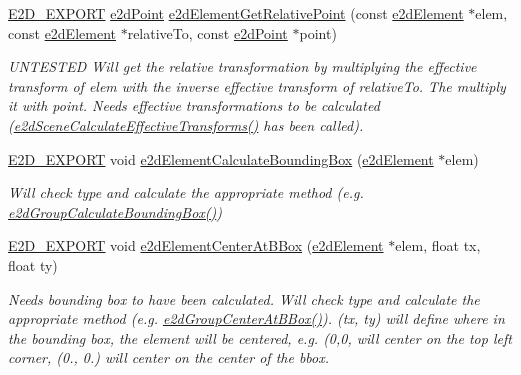 \begin{DoxyCompactItemize}
\hyperlink{Ez2DS_8h_a9f14e9cb869e1a85fdaba03afcca0df9}{E2\-D\-\_\-\-E\-X\-P\-O\-R\-T} \hyperlink{structe2dPoint}{e2d\-Point} \hyperlink{group__e2dElement_gae6b6f57ac5505ef9181289197d419536}{e2d\-Element\-Get\-Relative\-Point} (const \hyperlink{structe2dElement}{e2d\-Element} $\ast$elem, const \hyperlink{structe2dElement}{e2d\-Element} $\ast$relative\-To, const \hyperlink{structe2dPoint}{e2d\-Point} $\ast$point)
\begin{DoxyCompactList}\small\item\em U\-N\-T\-E\-S\-T\-E\-D Will get the relative transformation by multiplying the effective transform of elem with the inverse effective transform of relative\-To. The multiply it with point. Needs effective transformations to be calculated (\hyperlink{group__e2dScene_ga6981f2448904c96723449cb84ffb4d8a}{e2d\-Scene\-Calculate\-Effective\-Transforms()} has been called). \end{DoxyCompactList}\item 
\hyperlink{Ez2DS_8h_a9f14e9cb869e1a85fdaba03afcca0df9}{E2\-D\-\_\-\-E\-X\-P\-O\-R\-T} void \hyperlink{group__e2dElement_ga575c7363927670f1ea8c52b7ea23fcd5}{e2d\-Element\-Calculate\-Bounding\-Box} (\hyperlink{structe2dElement}{e2d\-Element} $\ast$elem)
\begin{DoxyCompactList}\small\item\em Will check type and calculate the appropriate method (e.\-g. \hyperlink{group__e2dGroup_gacf5659083b312e030456721b2560d4f4}{e2d\-Group\-Calculate\-Bounding\-Box()}) \end{DoxyCompactList}\item 
\hyperlink{Ez2DS_8h_a9f14e9cb869e1a85fdaba03afcca0df9}{E2\-D\-\_\-\-E\-X\-P\-O\-R\-T} void \hyperlink{group__e2dElement_gab829b280fa22a3509c40425fc84b5061}{e2d\-Element\-Center\-At\-B\-Box} (\hyperlink{structe2dElement}{e2d\-Element} $\ast$elem, float tx, float ty)
\begin{DoxyCompactList}\small\item\em Needs bounding box to have been calculated. Will check type and calculate the appropriate method (e.\-g. \hyperlink{group__e2dGroup_ga2800a7dc3827e8753e2f2c6ef2e05eb9}{e2d\-Group\-Center\-At\-B\-Box()}). (tx, ty) will define where in the bounding box, the element will be centered, e.\-g. (0,0, will center on the top left corner, (0., 0.) will center on the center of the bbox. \end{DoxyCompactList}\end{DoxyCompactItemize}


